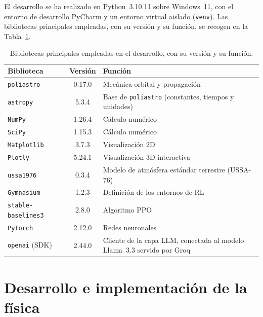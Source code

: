 El desarrollo se ha realizado en Python~3.10.11 sobre Windows~11, con el entorno de desarrollo PyCharm y un entorno virtual aislado (\texttt{venv}). Las bibliotecas principales empleadas, con su versión y su función, se recogen en la Tabla~\ref{tab:herramientas}.

\begin{table}[htbp]
  \centering
  \caption{Bibliotecas principales empleadas en el desarrollo, con su versión y su función.}
  \label{tab:herramientas}
  \begin{tabular}{l c p{6.6cm}}
    \hline
    \textbf{Biblioteca} & \textbf{Versión} & \textbf{Función} \\
    \hline
    \texttt{poliastro}~\cite{poliastro}             & 0.17.0 & Mecánica orbital y propagación \\
    \texttt{astropy}~\cite{astropy2022}             & 5.3.4  & Base de \texttt{poliastro} (constantes, tiempos y unidades) \\
    \texttt{NumPy}~\cite{numpy}                     & 1.26.4 & Cálculo numérico \\
    \texttt{SciPy}~\cite{scipy}                     & 1.15.3 & Cálculo numérico \\
    \texttt{Matplotlib}~\cite{matplotlib}           & 3.7.3  & Visualización 2D \\
    \texttt{Plotly}                                 & 5.24.1 & Visualización 3D interactiva \\
    \texttt{ussa1976}~\cite{ussa1976}               & 0.3.4  & Modelo de atmósfera estándar terrestre (USSA-76) \\
    \texttt{Gymnasium}~\cite{gymnasium}             & 1.2.3  & Definición de los entornos de \gls{RL} \\
    \texttt{stable-baselines3}~\cite{raffin2021sb3} & 2.8.0  & Algoritmo \gls{PPO} \\
    \texttt{PyTorch}~\cite{pytorch}& 2.12.0 & Redes neuronales \\
    \texttt{openai} (SDK)      & 2.44.0 & Cliente de la capa \gls{LLM}, conectada al modelo Llama~3.3 servido por Groq \\
    \hline
  \end{tabular}
\end{table}

\section{Desarrollo e implementación de la física}
\label{sec:implementacion}

